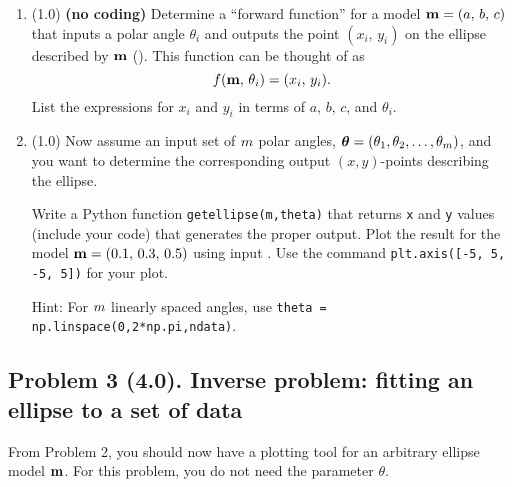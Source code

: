 \documentclass[11pt,titlepage,fleqn]{article}
\begin{document}
\begin{enumerate}
\item (1.0) {\bf (no coding)} Determine a ``forward function'' for a model $\mbox{${\bf m}$} = (a,\,b,\,c)$ that inputs a polar angle $\theta_i$ and outputs the point $(x_i,\,y_i)$ on the ellipse described by $\mbox{${\bf m}$}$ (). This function can be thought of as
%
\begin{equation}
f(\mbox{${\bf m}$},\,\theta_i) = (x_i,\,y_i).
\end{equation}
%
List the expressions for $x_i$ and $y_i$ in terms of $a$, $b$, $c$, and $\theta_i$.

\item (1.0) Now assume an input set of $m$ polar angles, $\mbox{\boldmath $\bf \theta$} = (\theta_1, \theta_2, \ldots, \theta_{m})$, and you want to determine the corresponding output $(x,y)$-points describing the ellipse.

Write a Python function \verb+getellipse(m,theta)+ that returns \verb+x+ and \verb+y+ values (include your code) that generates the proper output. Plot the result for the model $\mbox{${\bf m}$} = (0.1,\,0.3,\,0.5)$ using input . Use the command \verb+plt.axis([-5, 5, -5, 5])+ for your plot.

Hint: For $m$ linearly spaced angles, use \verb+theta = np.linspace(0,2*np.pi,ndata)+.

\end{enumerate}


\subsection*{Problem 3 (4.0). Inverse problem: fitting an ellipse to a set of data}

From Problem 2, you should now have a plotting tool for an arbitrary ellipse model $\mbox{${\bf m}$}$.
For this problem, you do not need the parameter $\theta$.
\end{document}

